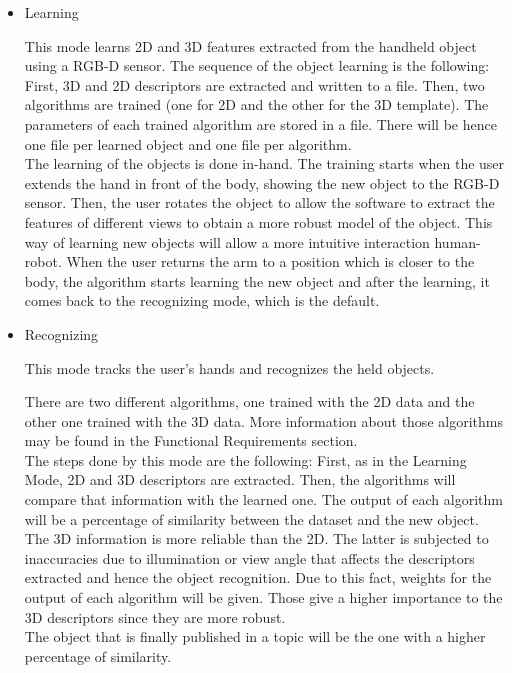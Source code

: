 \begin{itemize}

\item{Learning\\}

This mode learns 2D and 3D features extracted from the handheld object using a RGB-D sensor.   
The sequence of the object learning is the following:
\\
First, 3D and 2D descriptors are extracted and written to a file. Then, two algorithms are trained (one for 2D and the other for the 3D template). The parameters of each trained algorithm are stored in a file. There will be hence one file per learned object and one file per algorithm.
\\

The learning of the objects is done in-hand. The training starts when the user extends the hand in front of the body, showing the new object to the RGB-D sensor. Then, the user rotates the object to allow the software to extract the features of different views to obtain a more robust model of the object. This way of learning new objects will allow a more intuitive interaction human-robot. When the user returns the arm to a position which is closer to the body, the algorithm starts learning the new object and after the learning, it comes back to the recognizing mode, which is the default. 


\item{Recognizing\\}

This mode tracks the user's hands and recognizes the held objects. 

There are two different algorithms, one trained with the 2D data and the other one trained with the 3D data. More information about those algorithms may be found in the Functional Requirements section. 
\\
The steps done by this mode are the following: 
First, as in the Learning Mode, 2D and 3D descriptors are extracted. Then, the algorithms will compare that information with the learned one. 
The output of each algorithm will be a percentage of similarity between the dataset and the new object. 
The 3D information is more reliable than the 2D. The latter is subjected to inaccuracies due to illumination or view angle that affects the descriptors extracted and hence the object recognition.
Due to this fact, weights for the output of each algorithm will be given. Those give a higher importance to the 3D descriptors since they are more robust. 
\\
The object that is finally published in a topic will be the one with a higher percentage of similarity. 




\end{itemize}
